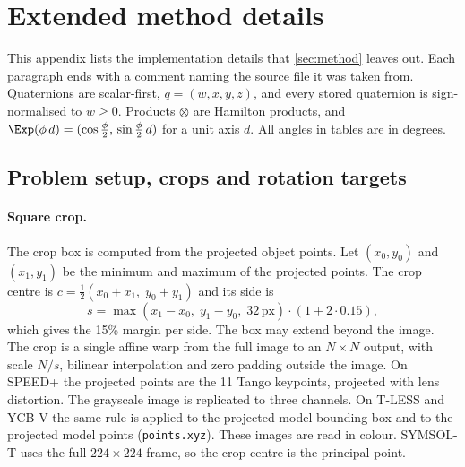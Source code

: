\section{Extended method details}\label{app:method}
This appendix lists the implementation details that \cref{sec:method} leaves out. Each paragraph ends with a comment naming the source file it was taken from. Quaternions are scalar-first, $q=(w,x,y,z)$, and every stored quaternion is sign-normalised to $w\ge0$. Products $\otimes$ are Hamilton products, and $\Exp(\phi\,d)=(\cos\tfrac{\phi}{2},\,\sin\tfrac{\phi}{2}\,d)$ for a unit axis $d$. All angles in tables are in degrees.

\subsection{Problem setup, crops and rotation targets}\label{app:setup}

\paragraph{Square crop.}
The crop box is computed from the projected object points. Let $(x_0,y_0)$ and $(x_1,y_1)$ be the minimum and maximum of the projected points. The crop centre is $c=\tfrac12(x_0+x_1,\;y_0+y_1)$ and its side is
\begin{equation}
  s=\max(x_1-x_0,\;y_1-y_0,\;32\,\text{px})\cdot(1+2\cdot0.15),
\end{equation}
which gives the 15\% margin per side. The box may extend beyond the image. The crop is a single affine warp from the full image to an $N\times N$ output, with scale $N/s$, bilinear interpolation and zero padding outside the image. On SPEED+ the projected points are the 11 Tango keypoints, projected with lens distortion. The grayscale image is replicated to three channels. On T-LESS and YCB-V the same rule is applied to the projected model bounding box and to the projected model points (\texttt{points.xyz}). These images are read in colour. SYMSOL-T uses the full $224\times224$ frame, so the crop centre is the principal point.


